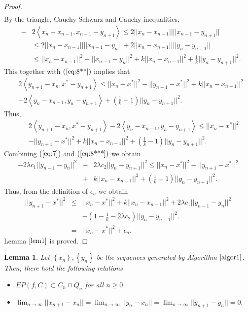 \documentclass{aims}
\newtheorem{lemma}[theorem]{Lemma}
\theoremstyle{definition}
\begin{document}
\begin{proof}
\begin{eqnarray}
\end{eqnarray}
By the triangle, Cauchy-Schwarz and Cauchy inequalities,
\begin{eqnarray*}
&-&2\left\langle x_n-x_{n-1},x_{n-1}-y_{n+1}\right\rangle\le2||x_n-x_{n-1}||||x_{n-1}-y_{n+1}||\\
&&\le2||x_n-x_{n-1}||||x_{n-1}-y_{n}||+2||x_n-x_{n-1}||||y_{n}-y_{n+1}||\\ 
&&\le|| x_n-x_{n-1}||^2+||x_{n-1}-y_{n}||^2+k|| x_n-x_{n-1}||^2+\frac{1}{k}||y_{n}-y_{n+1}||^2.
\end{eqnarray*}
This together with $(\ref{eq:8**})$ implies that 
\begin{align}
&2\left\langle y_{n+1}-x_n,x^*-y_{n+1}\right\rangle\le ||x_n-x^*||^2-||y_{n+1}-x^*||^2+k|| x_n-x_{n-1}||^2\nonumber\\
&+2\left\langle y_n-x_{n-1},y_{n}-y_{n+1}\right\rangle+\left(\frac{1}{k}-1\right)||y_{n}-y_{n+1}||^2\label{eq:8***}.
\end{align}
Thus, 
\begin{eqnarray}
&&2\left\langle y_{n+1}-x_n,x^*-y_{n+1}\right\rangle-2\left\langle y_n-x_{n-1},y_{n}-y_{n+1}\right\rangle\le||x_n-x^*||^2\nonumber\\
&&-||y_{n+1}-x^*||^2+k|| x_n-x_{n-1}||^2+\left(\frac{1}{k}-1\right)||y_{n}-y_{n+1}||^2\label{eq:8***}.
\end{eqnarray}
Combining $(\ref{eq:7})$ and $(\ref{eq:8***})$ we obtain 
\begin{eqnarray*}
-2\lambda c_1||y_{n-1}-y_n||^2&-&2\lambda c_2||y_n-y_{n+1}||^2\le||x_n-x^*||^2-||y_{n+1}-x^*||^2\\
&+&k|| x_n-x_{n-1}||^2+\left(\frac{1}{k}-1\right)||y_{n}-y_{n+1}||^2. 
\end{eqnarray*}
Thus, from the definition of $\epsilon_n$ we obtain
\begin{eqnarray*}
||y_{n+1}-x^*||^2&\leq&||x_n-x^*||^2+k|| x_n-x_{n-1}||^2+2\lambda c_1||y_{n-1}-y_n||^2\\
&&-\left(1-\frac{1}{k}-2\lambda c_2\right)||y_{n}-y_{n+1}||^2. \\
&=&||x_n-x^*||^2+\epsilon_n.
\end{eqnarray*}
Lemma $\ref{lem1}$ is proved.
\end{proof}
\begin{lemma}\label{lem4}
Let $\left\{x_n\right\},\left\{y_n\right\}$ be the sequences generated by Algorithm $\ref{algor1}$. Then, there hold the following relations
\begin{itemize}
\item [$(i)$] $EP(f,C)\subset C_n\cap Q_n$ for all $n\ge 0$.
\item [$(ii)$] $\lim_{n\to\infty}||x_{n+1}-x_n||=\lim_{n\to\infty}||y_n-x_n||=\lim_{n\to\infty}||y_{n+1} - y_{n}||=0.$
\end{itemize}
\end{lemma}
\end{document}
